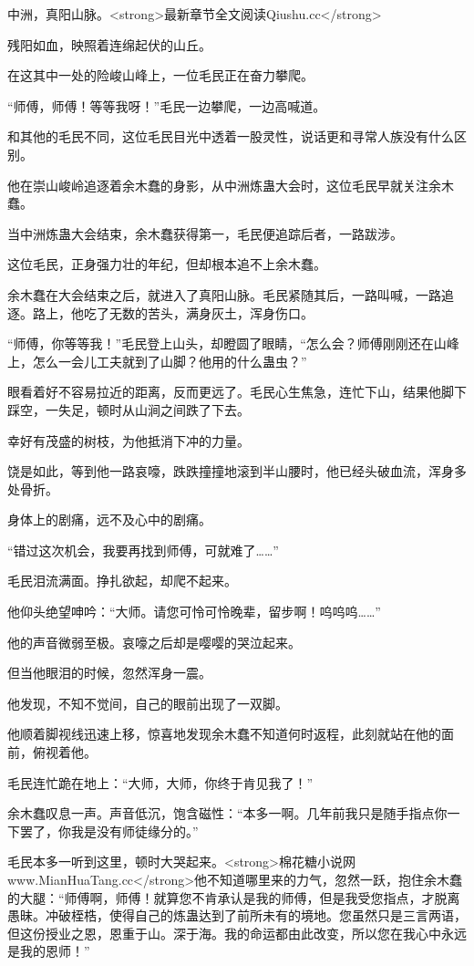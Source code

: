 
\begin{this_body}

中洲，真阳山脉。<strong>最新章节全文阅读Qiushu.cc</strong>

残阳如血，映照着连绵起伏的山丘。

在这其中一处的险峻山峰上，一位毛民正在奋力攀爬。

“师傅，师傅！等等我呀！”毛民一边攀爬，一边高喊道。

和其他的毛民不同，这位毛民目光中透着一股灵性，说话更和寻常人族没有什么区别。

他在崇山峻岭追逐着余木蠢的身影，从中洲炼蛊大会时，这位毛民早就关注余木蠢。

当中洲炼蛊大会结束，余木蠢获得第一，毛民便追踪后者，一路跋涉。

这位毛民，正身强力壮的年纪，但却根本追不上余木蠢。

余木蠢在大会结束之后，就进入了真阳山脉。毛民紧随其后，一路叫喊，一路追逐。路上，他吃了无数的苦头，满身灰土，浑身伤口。

“师傅，你等等我！”毛民登上山头，却瞪圆了眼睛，“怎么会？师傅刚刚还在山峰上，怎么一会儿工夫就到了山脚？他用的什么蛊虫？”

眼看着好不容易拉近的距离，反而更远了。毛民心生焦急，连忙下山，结果他脚下踩空，一失足，顿时从山涧之间跌了下去。

幸好有茂盛的树枝，为他抵消下冲的力量。

饶是如此，等到他一路哀嚎，跌跌撞撞地滚到半山腰时，他已经头破血流，浑身多处骨折。

身体上的剧痛，远不及心中的剧痛。

“错过这次机会，我要再找到师傅，可就难了……”

毛民泪流满面。挣扎欲起，却爬不起来。

他仰头绝望呻吟：“大师。请您可怜可怜晚辈，留步啊！呜呜呜……”

他的声音微弱至极。哀嚎之后却是嘤嘤的哭泣起来。

但当他眼泪的时候，忽然浑身一震。

他发现，不知不觉间，自己的眼前出现了一双脚。

他顺着脚视线迅速上移，惊喜地发现余木蠢不知道何时返程，此刻就站在他的面前，俯视着他。

毛民连忙跪在地上：“大师，大师，你终于肯见我了！”

余木蠢叹息一声。声音低沉，饱含磁性：“本多一啊。几年前我只是随手指点你一下罢了，你我是没有师徒缘分的。”

毛民本多一听到这里，顿时大哭起来。<strong>棉花糖小说网www.MianHuaTang.cc</strong>他不知道哪里来的力气，忽然一跃，抱住余木蠢的大腿：“师傅啊，师傅！就算您不肯承认是我的师傅，但是我受您指点，才脱离愚昧。冲破桎梏，使得自己的炼蛊达到了前所未有的境地。您虽然只是三言两语，但这份授业之恩，恩重于山。深于海。我的命运都由此改变，所以您在我心中永远是我的恩师！”


\end{this_body}
